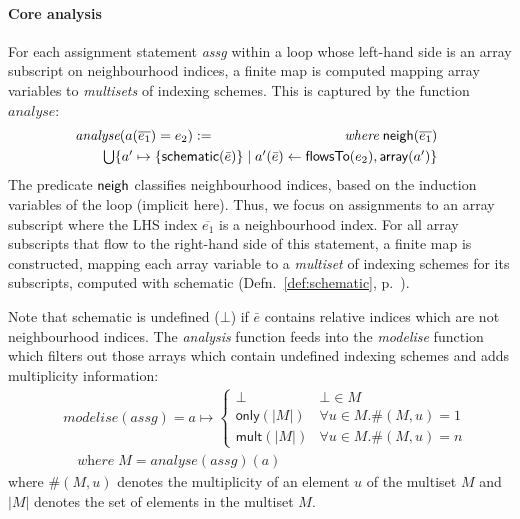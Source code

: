 \documentclass[10pt,preprint]{sigplanconf}
\theoremstyle{definition}
\newcommand{\arrayTy}{\textsf{array}}
\begin{document}
\paragraph{Core analysis}
For each assignment statement \textit{assg} within a loop whose left-hand side is an array
subscript on neighbourhood indices, a finite map is computed mapping
array variables to \emph{multisets} of indexing schemes.
This is captured by the function $\textit{analyse}$:
%
\begin{align*}
\hspace{-0.5em}
\begin{array}{lr}
\textit{analyse}(a(\overline{e_1}) = e_2)
 := \qquad\qquad\qquad & \textit{where} \; \neigh(\overline{e_1}) \\[0.3em]
\multicolumn{2}{l}{\qquad \bigcup\{a' \mapsto \{
\textsf{schematic}(\bar{e})\} \mid a'(\bar{e}) \leftarrow \mathsf{flowsTo}(e_2),
  \arrayTy(a')\}}
\end{array}
\end{align*}
%
The predicate $\textsf{neigh}$ classifies neighbourhood indices, based on
the induction variables of the loop (implicit here).
Thus, we focus on assignments to an array subscript where the LHS
index $\overline{e_1}$ is a neighbourhood index.  For
all array subscripts that flow to the right-hand side of this
statement, a finite map is constructed, mapping each array variable
to a \emph{multiset} of indexing schemes for its subscripts, computed
with \textsf{schematic} (Defn.~\ref{def:schematic},
p.~\pageref{def:schematic}).

Note that \textsf{schematic} is undefined ($\bot$) if
$\bar{e}$ contains relative indices which are not neighbourhood
indices. The \textit{analysis} function feeds into the
\textit{modelise} function which filters out those arrays
which contain undefined indexing schemes and adds multiplicity
information:
%
\begin{align*}
& \mathit{modelise} (\textit{assg})
= a \mapsto
\begin{cases}
\bot & \bot \in M \\
\textsf{only}(|M|) & \forall u \in M . \#(M, u) = 1 \\
\textsf{mult}(|M|) & \forall u \in M . \#(M, u) = n
\end{cases} \\
& \quad \textit{where} \; M = \mathit{analyse}(\textit{assg}) (a)
\end{align*}
where $\#(M, u)$ denotes the multiplicity of an element $u$ of the
multiset $M$ and $|M|$ denotes the set of elements in the multiset
$M$.
\end{document}
